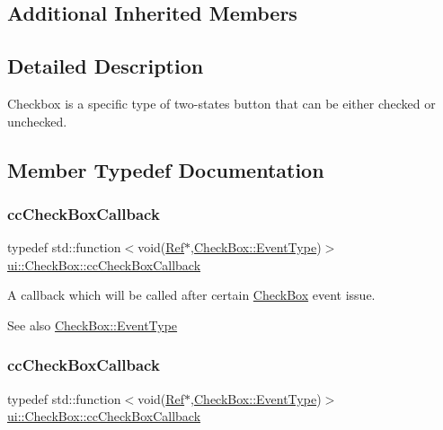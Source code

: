 \subsection*{Additional Inherited Members}


\subsection{Detailed Description}
Checkbox is a specific type of two-\/states button that can be either checked or unchecked. 

\subsection{Member Typedef Documentation}
\mbox{\label{classui_1_1CheckBox_ad210762967d1b444f5cf94f5e7450c56}} 
\subsubsection{\texorpdfstring{cc\+Check\+Box\+Callback}{ccCheckBoxCallback}\hspace{0.1cm}{\footnotesize\ttfamily [1/2]}}
{\footnotesize\ttfamily typedef std\+::function$<$void(\hyperlink{classRef}{Ref}$\ast$,\hyperlink{classui_1_1CheckBox_a72686e7bedf29fe84c5bc952be237b50}{Check\+Box\+::\+Event\+Type})$>$ \hyperlink{classui_1_1CheckBox_ad210762967d1b444f5cf94f5e7450c56}{ui\+::\+Check\+Box\+::cc\+Check\+Box\+Callback}}

A callback which will be called after certain \hyperlink{classui_1_1CheckBox}{Check\+Box} event issue. \begin{DoxySeeAlso}{See also}
{\ttfamily \hyperlink{classui_1_1CheckBox_a72686e7bedf29fe84c5bc952be237b50}{Check\+Box\+::\+Event\+Type}} 
\end{DoxySeeAlso}
\mbox{\label{classui_1_1CheckBox_ad210762967d1b444f5cf94f5e7450c56}} 
\subsubsection{\texorpdfstring{cc\+Check\+Box\+Callback}{ccCheckBoxCallback}\hspace{0.1cm}{\footnotesize\ttfamily [2/2]}}
{\footnotesize\ttfamily typedef std\+::function$<$void(\hyperlink{classRef}{Ref}$\ast$,\hyperlink{classui_1_1CheckBox_a72686e7bedf29fe84c5bc952be237b50}{Check\+Box\+::\+Event\+Type})$>$ \hyperlink{classui_1_1CheckBox_ad210762967d1b444f5cf94f5e7450c56}{ui\+::\+Check\+Box\+::cc\+Check\+Box\+Callback}}

